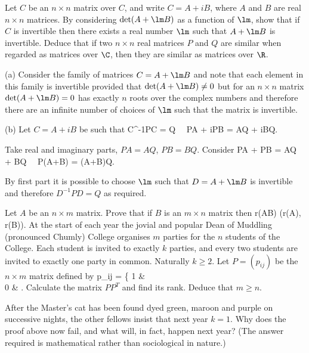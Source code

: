 \begin{problem}
Let $C$ be an $n \times n$ matrix over $C$, and write $C = A + iB$, where $A$ and $B$ are real $n \times n$ matrices. By considering $\det(A + \lm B)$ as a function of $\lm$, show that if $C$ is invertible then there exists a real number $\lm$ such that $A + \lm B$ is invertible. Deduce that if two $n \times n$ real matrices $P$ and $Q$ are similar when regarded as matrices over $\C$, then they are similar as matrices over $\R$.
\end{problem}

\begin{solution}[\bf Solution.]
\ben
\item [(a)] Consider the family of matrices $C= A + \lm B$ and note that each element in this family is invertible provided that $\det(A+\lm B)\neq 0$ but for an $n\times n$ matrix $\det(A+\lm B) =0$ has exactly $n$ roots over the complex numbers and therefore there are an infinite number of choices of $\lm$ such that the matrix is invertible.
\item [(b)] Let $C=A+iB$ be such that 
\be
C^{-1}PC = Q \ \ra\ PA + iPB = AQ + iBQ.
\ee

Take real and imaginary parts, $PA = AQ$, $PB = BQ$. Consider 
\be
PA + \lm PB = AQ + \lm BQ \ \ra \ P(A+\lm B) = (A+\lm B)Q.
\ee

By first part it is possible to choose $\lm$ such that $D= A+\lm B$ is invertible and therefore $D^{-1}PD = Q$ as required.
\een
\end{solution}


\begin{problem}
Let $A$ be an $n \times m$ matrix. Prove that if $B$ is an $m \times n$ matrix then
\be
r(AB) \leq \min(r(A), r(B)).
\ee
At the start of each year the jovial and popular Dean of Muddling (pronounced Chumly) College organises $m$ parties for the $n$ students of the College. Each student is invited to exactly $k$ parties, and every two students are invited to exactly one party in common. Naturally $k \geq 2$. Let $P = (p_{ij})$ be the $n \times m$ matrix defined by
\be
p_{ij} = \left\{
1 \quad\quad & \\
0 & 
\ea\right.
\ee
Calculate the matrix $PP^T$ and find its rank. Deduce that $m \geq n$. 

After the Master's cat has been found dyed green, maroon and purple on successive nights, the other fellows insist that next year $k = 1$. Why does the proof above now fail, and what will, in fact, happen next year? (The answer required is mathematical rather than sociological in nature.)
\end{problem}

